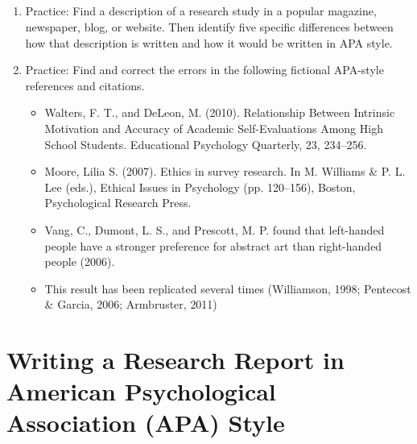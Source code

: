 \subsection{}
\begin{fullwidth}
\begin{enumerate}
\item Practice: Find a description of a research study in a popular magazine, newspaper, blog, or website. Then identify five specific differences between how that description is written and how it would be written in APA style.


\item Practice: Find and correct the errors in the following fictional APA-style references and citations.

\begin{itemize}
\item Walters, F. T., and DeLeon, M. (2010). Relationship Between Intrinsic Motivation and Accuracy of Academic Self-Evaluations Among High School Students. Educational Psychology Quarterly, 23, 234–256.

\item Moore, Lilia S. (2007). Ethics in survey research. In M. Williams \& P. L. Lee (eds.), Ethical Issues in Psychology (pp. 120–156), Boston, Psychological Research Press.

\item Vang, C., Dumont, L. S., and Prescott, M. P. found that left-handed people have a stronger preference for abstract art than right-handed people (2006).

\item This result has been replicated several times (Williamson, 1998; Pentecost \& Garcia, 2006; Armbruster, 2011)

\end{itemize}
\end{enumerate}
\end{fullwidth}  


\section{Writing a Research Report in American Psychological Association (APA) Style}



